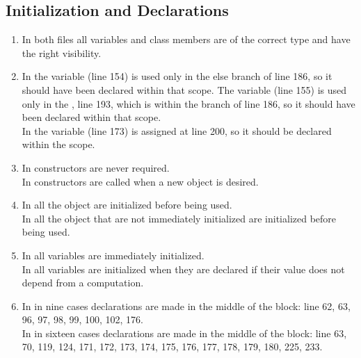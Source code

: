\subsection{Initialization and Declarations}
\begin{enumerate}[NUM]
    \item In both files all variables and class members are of the correct type and have the right visibility.
   
    \item In  the variable  (line 154) is used only in the else branch of line 186, so it should have been declared within that scope. The variable  (line 155) is used only in the , line 193, which is within the  branch of line 186, so it should have been declared within that scope.\\
    In  the variable  (line 173) is assigned at line 200, so it should be declared within the  scope.
    
    \item In  constructors are never required.\\
    In  constructors are called when a new object is desired.
   
    \item In  all the object are initialized before being used.\\
    In  all the object that are not immediately initialized are initialized before being used.\\
   
    \item In  all variables are immediately initialized.\\
     In  all variables are initialized when they are declared if their value does not depend from a computation.
   
    \item In  in nine cases declarations are made in the middle of the block: line 62, 63, 96, 97, 98, 99, 100, 102, 176.\\
    In  in sixteen cases declarations are made in the middle of the block: line 63, 70, 119, 124, 171, 172, 173, 174, 175, 176, 177, 178, 179, 180, 225, 233.
\end{enumerate}

